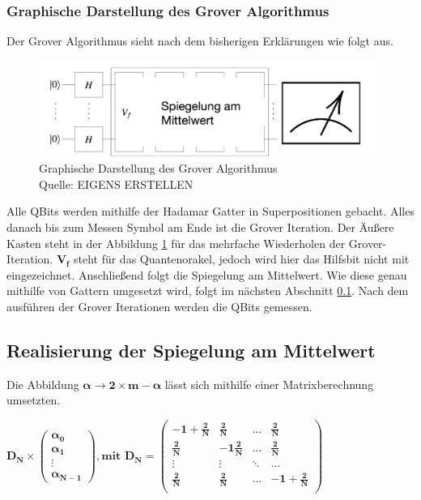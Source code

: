 \subsubsection{Graphische Darstellung des Grover Algorithmus}
Der Grover Algorithmus sieht nach dem bisherigen Erklärungen wie folgt aus.
\begin{figure}[hbtp]
	\centering
	\includegraphics[width=1\textwidth]{figures/algoInformell.png}
	\caption{Graphische Darstellung des Grover Algorithmus \\ Quelle:  EIGENS ERSTELLEN }
	\label{fig:algoInformell}
\end{figure}
Alle QBits werden mithilfe der Hadamar Gatter in Superpositionen gebacht. Alles danach bis zum Messen Symbol am Ende ist die Grover Iteration.
Der Äußere Kasten steht in der Abbildung \ref{fig:algoInformell} für das mehrfache Wiederholen der Grover-Iteration. $\mathbf{V_f}$ steht für das Quantenorakel, jedoch wird hier das Hilfsbit nicht mit eingezeichnet.  Anschließend folgt die Spiegelung am Mittelwert. Wie diese genau mithilfe von Gattern umgesetzt wird, folgt im nächsten Abschnitt \ref{sec:realiserung}. Nach dem ausführen der Grover Iterationen werden die QBits gemessen.
\subsection{Realisierung der Spiegelung am Mittelwert}
\label{sec:realiserung}
Die Abbildung $\mathbf{\alpha \rightarrow 2 \times m - \alpha}$ lässt sich mithilfe einer Matrixberechnung umsetzten.
\begin{center}
	$\mathbf{D_N \times 
	\begin{pmatrix}
			\alpha_0 \\ \alpha_1 \\ \vdots \\  \alpha_{N-1}
	\end{pmatrix}, \text{mit } D_N = 
	\begin{pmatrix}
			-1 + \frac{2}{N} & \frac{2}{N} & \dots& \frac{2}{N} \\
			\frac{2}{N} & -1 \frac{2}{N} & \dots& \frac{2}{N} \\
			\vdots & \vdots & \ddots& \dots \\
			 \frac{2}{N} & \frac{2}{N} & \dots& -1+ \frac{2}{N} \\
	\end{pmatrix}}$
\end{center}
